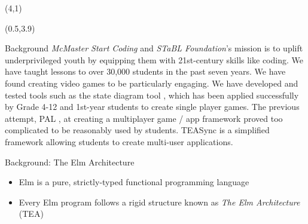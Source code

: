 \documentclass[22pt]{beamer}
\begin{document}
\begin{frame}[fragile]
    \begin{textblock}{8}(4,1)
        \titlepage
    \end{textblock}

    \begin{textblock}{7.25}(0.5,3.9)

        \begin{block}{\fontsize{37}{20}\selectfont Background}
            \textit{McMaster Start Coding} and \textit{STaBL Foundation}'s mission is to uplift underprivileged
            youth by equipping them with 21st-century skills like coding. We have taught lessons to over
            30,000 students in the past seven years. We have found creating video games to be particularly
            engaging. We have developed and tested tools such as the state diagram tool
            \cite{pasupathi2022teaching}, which has been applied successfully by Grade 4-12 and 1st-year
            students to create single player games. The previous attempt, PAL \cite{schankula2020newyouthhack}, at creating a
            multiplayer game / app framework proved too complicated to be reasonably used by students. TEASync
            is a simplified framework allowing students to create multi-user applications.
            \vspace{5mm}
        \end{block}

        \begin{block}{\fontsize{37}{20}\selectfont Background: The Elm Architecture}
            \begin{itemize}
                \item Elm is a pure, strictly-typed functional programming language
                \item Every Elm program follows a rigid structure known as \textit{The Elm Architecture} (TEA)
            \end{itemize}
            \vspace{-6mm}
        \end{block}


\end{textblock}
\end{frame}
\end{document}
